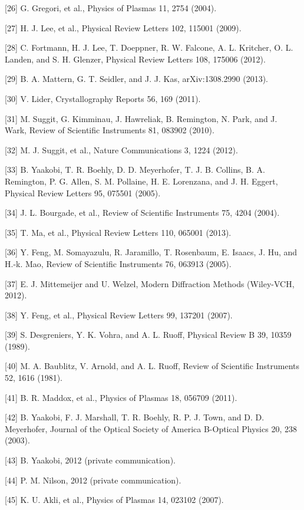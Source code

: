 {[}26{]} G. Gregori, et al., Physics of Plasmas 11, 2754 (2004).

{[}27{]} H. J. Lee, et al., Physical Review Letters 102, 115001 (2009).

{[}28{]} C. Fortmann, H. J. Lee, T. Doeppner, R. W. Falcone, A. L. Kritcher, O. L. Landen, and S. H. Glenzer, Physical Review Letters 108, 175006 (2012).

{[}29{]} B. A. Mattern, G. T. Seidler, and J. J. Kas, arXiv:1308.2990 (2013).

{[}30{]} V. Lider, Crystallography Reports 56, 169 (2011).

{[}31{]} M. Suggit, G. Kimminau, J. Hawreliak, B. Remington, N. Park, and J. Wark, Review of Scientific Instruments 81, 083902 (2010).

{[}32{]} M. J. Suggit, et al., Nature Communications 3, 1224 (2012).

{[}33{]} B. Yaakobi, T. R. Boehly, D. D. Meyerhofer, T. J. B. Collins, B. A. Remington, P. G. Allen, S. M. Pollaine, H. E. Lorenzana, and J. H. Eggert, Physical Review Letters 95, 075501 (2005).

{[}34{]} J. L. Bourgade, et al., Review of Scientific Instruments 75, 4204 (2004).

{[}35{]} T. Ma, et al., Physical Review Letters 110, 065001 (2013).

{[}36{]} Y. Feng, M. Somayazulu, R. Jaramillo, T. Rosenbaum, E. Isaacs, J. Hu, and H.-k. Mao, Review of Scientific Instruments 76, 063913 (2005).

{[}37{]} E. J. Mittemeijer and U. Welzel, Modern Diffraction Methods (Wiley-VCH, 2012).

{[}38{]} Y. Feng, et al., Physical Review Letters 99, 137201 (2007).

{[}39{]} S. Desgreniers, Y. K. Vohra, and A. L. Ruoff, Physical Review B 39, 10359 (1989).

{[}40{]} M. A. Baublitz, V. Arnold, and A. L. Ruoff, Review of Scientific Instruments 52, 1616 (1981).

{[}41{]} B. R. Maddox, et al., Physics of Plasmas 18, 056709 (2011).

{[}42{]} B. Yaakobi, F. J. Marshall, T. R. Boehly, R. P. J. Town, and D. D. Meyerhofer, Journal of the Optical Society of America B-Optical Physics 20, 238 (2003).

{[}43{]} B. Yaakobi, 2012 (private communication).

{[}44{]} P. M. Nilson, 2012 (private communication).

{[}45{]} K. U. Akli, et al., Physics of Plasmas 14, 023102 (2007).


